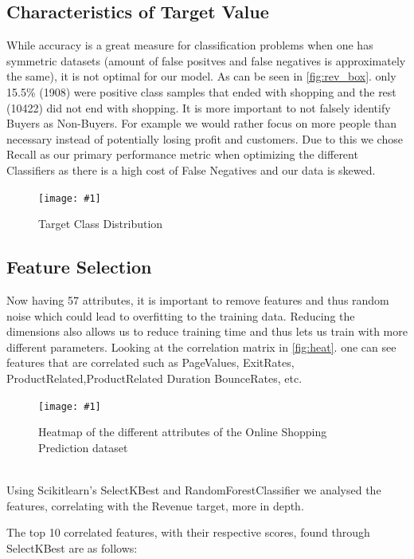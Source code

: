 \documentclass{article}
\newcommand{\image}[3]{
\begin{figure}
\begin{center}
\texttt{[image: \#1]}
\caption{#2}
#3
\end{center}
\end{figure}
}
\newcommand{\secref}[1]{\autoref{#1}. \texit{\nameref{#1}}}
\begin{document}
\subsection{Characteristics of Target Value}
While accuracy is a great measure for classification problems when one has symmetric datasets (amount of false positves and false negatives is approximately the same), it is not optimal for our model.
As can be seen in \secref{fig:rev_box} only 15.5\% (1908) were positive class samples that ended with shopping and the rest (10422) did not end with shopping. It is more important to not falsely identify Buyers as Non-Buyers. For example we would rather focus on more people than necessary instead of potentially losing profit and customers. Due to this we chose Recall as our primary performance metric when optimizing the different Classifiers as there is a high cost of False Negatives and our data is skewed.
\image{plots/revenue_boxplot.png}{Target Class Distribution}{\label{fig:rev_box}}

\subsection{Feature Selection}

Now having 57 attributes, it is important to remove features and thus random noise which could lead to overfitting to the training data. Reducing the dimensions also allows us to reduce training time and thus lets us train with more different parameters. Looking at the correlation matrix in \secref{fig:heat} one can see features that are correlated such as PageValues, ExitRates, ProductRelated,ProductRelated Duration BounceRates, etc.
\image{plots/heatmap.png}{Heatmap of the different attributes of the Online Shopping Prediction dataset}{\label{fig:heat}} \\
\newline
Using Scikitlearn's SelectKBest and RandomForestClassifier we analysed the features, correlating with the Revenue target, more in depth. \\
\newline

The top 10 correlated features, with their respective scores, found through SelectKBest are as follows:
\end{document}
